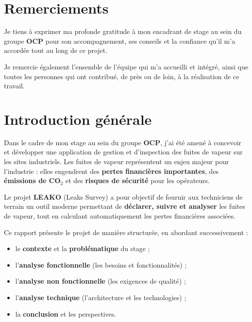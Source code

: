 \documentclass[12pt,a4paper,oneside]{report}
\begin{document}
\chapter*{Remerciements}

Je tiens à exprimer ma profonde gratitude à mon encadrant de stage au sein du groupe \textbf{OCP} pour son accompagnement, ses conseils et la confiance qu'il m'a accordée tout au long de ce projet.

Je remercie également l'ensemble de l'équipe qui m'a accueilli et intégré, ainsi que toutes les personnes qui ont contribué, de près ou de loin, à la réalisation de ce travail.

\newpage

\tableofcontents
\newpage

\chapter*{Introduction générale}

Dans le cadre de mon stage au sein du groupe \textbf{OCP}, j'ai été amené à concevoir et développer une application de gestion et d'inspection des fuites de vapeur sur les sites industriels. Les fuites de vapeur représentent un enjeu majeur pour l'industrie : elles engendrent des \textbf{pertes financières importantes}, des \textbf{émissions de CO$_2$} et des \textbf{risques de sécurité} pour les opérateurs.

Le projet \textbf{LEAKO} (Leaks Survey) a pour objectif de fournir aux techniciens de terrain un outil moderne permettant de \textbf{déclarer, suivre et analyser} les fuites de vapeur, tout en calculant automatiquement les pertes financières associées.

Ce rapport présente le projet de manière structurée, en abordant successivement :
\begin{itemize}
    \item le \textbf{contexte} et la \textbf{problématique} du stage ;
    \item l'\textbf{analyse fonctionnelle} (les besoins et fonctionnalités) ;
    \item l'\textbf{analyse non fonctionnelle} (les exigences de qualité) ;
    \item l'\textbf{analyse technique} (l'architecture et les technologies) ;
    \item la \textbf{conclusion} et les perspectives.
\end{itemize}
\end{document}
